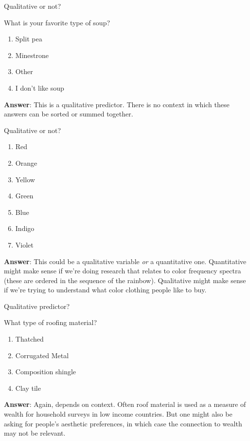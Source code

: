 \documentclass[aspectratio=169]{beamer}
\begin{document}
\begin{frame}{Qualitative or not?}

What is your favorite type of soup?
\begin{enumerate}
\item Split pea
\item Minestrone
\item Other
\item I don't like soup
\end{enumerate}

\vspace{5mm}

\textbf{Answer}: \pause This is a qualitative predictor.  There is no context in which these answers can be sorted or summed together.

\end{frame}

\begin{frame}{Qualitative or not?}

\begin{enumerate}
\item Red
\item Orange
\item Yellow
\item Green
\item Blue
\item Indigo
\item Violet
\end{enumerate}

\vspace{5mm}

\textbf{Answer}: \pause This could be a qualitative variable \textit{or } a quantitative one.  Quantitative might make sense if we're doing research that relates to color frequency spectra (these are ordered in the sequence of the rainbow).  Qualitative might make sense if we're trying to understand what color clothing people like to buy.

\end{frame}

\begin{frame}{Qualitative predictor?}

What type of roofing material?
\begin{enumerate}
\item Thatched
\item Corrugated Metal
\item Composition shingle
\item Clay tile
\end{enumerate}

\vspace{5mm}

\textbf{Answer}: \pause Again, depends on context.  Often roof material is used as a measure of wealth for household surveys in low income countries.  But one might also be asking for people's aesthetic preferences, in which case the connection to wealth may not be relevant.  

\end{frame}
\end{document}
